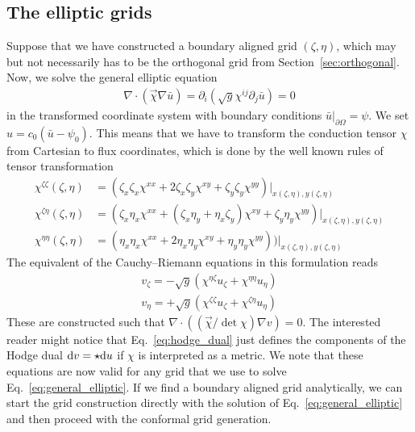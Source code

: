 \subsection{The elliptic grids} \label{sec:elliptic}
Suppose that we have constructed a boundary aligned grid $(\zeta,\eta)$, which
may but not necessarily has to be the orthogonal grid from Section~\ref{sec:orthogonal}. 
Now, we solve the general elliptic equation
\begin{align}
 \nabla\cdot(\vec \chi \nabla \bar u) = \partial_i(\sqrt{g} \chi^{ij}\partial_j \bar u) = 0
  \label{eq:general_elliptic}
\end{align}
in the transformed coordinate system with boundary conditions $\bar u|_{\partial\Omega}=\psi$. We set $u=c_0(\bar u -\psi_0)$. This means that we have to 
transform the conduction tensor $\chi$ from Cartesian to flux coordinates,
which is done by the well known rules of tensor transformation
\begin{subequations}
\begin{align}
  \chi^{\zeta\zeta}(\zeta, \eta) &= (\zeta_x\zeta_x \chi^{xx} + 2\zeta_x\zeta_y\chi^{xy} + \zeta_y\zeta_y \chi^{yy})|_{x(\zeta,\eta), y(\zeta,\eta)}\\
  \chi^{\zeta\eta}(\zeta, \eta) &= (\zeta_x\eta_x \chi^{xx} + (\zeta_x\eta_y + \eta_x\zeta_y)\chi^{xy} + \zeta_y\eta_y \chi^{yy})|_{x(\zeta,\eta), y(\zeta,\eta)}\\
  \chi^{\eta\eta} (\zeta, \eta) &= (\eta_x\eta_x \chi^{xx} + 2\eta_x\eta_y\chi^{xy} + \eta_y\eta_y \chi^{yy}))|_{x(\zeta,\eta), y(\zeta,\eta)}
\end{align}
\label{eq:transformationChi}
\end{subequations}
The equivalent of the Cauchy--Riemann equations in this formulation reads
\begin{subequations}
\begin{align}
  v_\zeta = -\sqrt{g}(\chi^{\eta\zeta}u_\zeta + \chi^{\eta\eta}u_\eta)\\
  v_\eta = +\sqrt{g}(\chi^{\zeta\zeta}u_\zeta + \chi^{\zeta\eta}u_\eta)
\end{align}
  \label{eq:hodge_dual}
\end{subequations}
These are constructed such that
 $\nabla\cdot((\vec \chi/ \det \chi) \nabla v) = 0$.
The interested reader might notice that Eq.~\eqref{eq:hodge_dual} just 
defines the components of the Hodge dual $\mathrm{d} v = \star\mathrm{d} u$  
if $\chi$  is interpreted as a metric.
We note that these equations are now valid for any grid that  
we use to solve Eq.~\eqref{eq:general_elliptic}. If we find a boundary
aligned grid analytically, we can start the grid construction 
directly with the solution of Eq.~\eqref{eq:general_elliptic} 
and then proceed with the conformal grid generation. 

